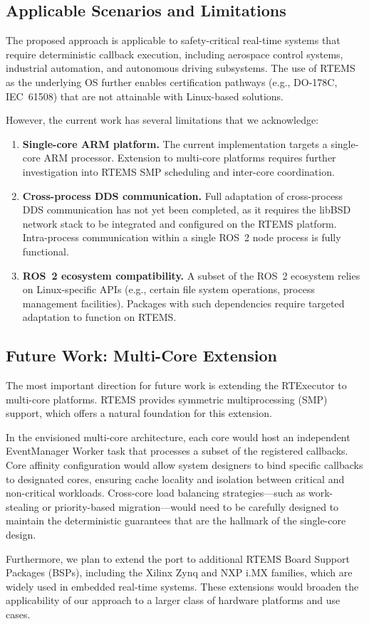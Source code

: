 \subsection{Applicable Scenarios and Limitations}

The proposed approach is applicable to safety-critical real-time systems that require deterministic callback execution, including aerospace control systems, industrial automation, and autonomous driving subsystems. The use of RTEMS as the underlying OS further enables certification pathways (e.g., DO-178C, IEC~61508) that are not attainable with Linux-based solutions.

However, the current work has several limitations that we acknowledge:

\begin{enumerate}
    \item \textbf{Single-core ARM platform.} The current implementation targets a single-core ARM processor. Extension to multi-core platforms requires further investigation into RTEMS SMP scheduling and inter-core coordination.
    \item \textbf{Cross-process DDS communication.} Full adaptation of cross-process DDS communication has not yet been completed, as it requires the libBSD network stack to be integrated and configured on the RTEMS platform. Intra-process communication within a single ROS~2 node process is fully functional.
    \item \textbf{ROS~2 ecosystem compatibility.} A subset of the ROS~2 ecosystem relies on Linux-specific APIs (e.g., certain file system operations, process management facilities). Packages with such dependencies require targeted adaptation to function on RTEMS.
\end{enumerate}

\subsection{Future Work: Multi-Core Extension}

The most important direction for future work is extending the RTExecutor to multi-core platforms. RTEMS provides symmetric multiprocessing (SMP) support, which offers a natural foundation for this extension.

In the envisioned multi-core architecture, each core would host an independent EventManager Worker task that processes a subset of the registered callbacks. Core affinity configuration would allow system designers to bind specific callbacks to designated cores, ensuring cache locality and isolation between critical and non-critical workloads. Cross-core load balancing strategies---such as work-stealing or priority-based migration---would need to be carefully designed to maintain the deterministic guarantees that are the hallmark of the single-core design.

Furthermore, we plan to extend the port to additional RTEMS Board Support Packages (BSPs), including the Xilinx Zynq and NXP i.MX families, which are widely used in embedded real-time systems. These extensions would broaden the applicability of our approach to a larger class of hardware platforms and use cases.
